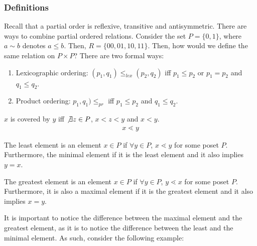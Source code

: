 \documentclass[a4paper]{article}
\theoremstyle{plain}
\theoremstyle{definition}
\newtheorem{defn}{Definition}[section]
\theoremstyle{remark}
\begin{document}
\subsubsection{Definitions}
Recall that a partial order is reflexive, transitive and antisymmetric. There are ways to combine partial ordered relations. Consider the set $P=\{ 0,1 \}$, where $a \sim b$ denotes $a \le b$. Then, $R = \{ 00, 01, 10, 11 \}$. Then, how would we define the same relation on  $P \times P$? There are two formal ways:
\begin{enumerate}
	\item Lexicographic ordering: $(p_1,q_1) \le_{lex}  (p_2,q_2)$ iff $p_1 \le  p_2$ or $p_1 = p_2$ and $q_1 \le q_2$.
	\item Product ordering: $p_1,q_1) \le _{pr}$ iff $p_1 \le  p_2$ and $q_1 \le q_2$.
\end{enumerate}
\begin{tcolorbox}[colback=black!3!white,colframe=black!60!white,title=\begin{defn}Covering \label{Covering}\end{defn}] $x$ is covered by $y$ iff $\not\exists z \in P$, $x < z < y$ and $x<y$.
\begin{align}
x \lessdot y
\end{align}
\end{tcolorbox}
\begin{tcolorbox}[colback=black!3!white,colframe=black!60!white,title=\begin{defn}The least element \label{The least element}\end{defn}]
The least element is an element $x \in P$ if $\forall y \in P$, $x \lessdot y$ for some poset $P$. Furthermore, the minimal element if it is the least element and it also implies $y=x$.
\end{tcolorbox}
\begin{tcolorbox}[colback=black!3!white,colframe=black!60!white,title=\begin{defn}The greatest element \label{The greatest element}\end{defn}]
The greatest element is an element $x \in P$ if $\forall y \in P$, $y \lessdot x$ for some poset $P$. Furthermore, it is also a maximal element if it is the greatest element and it also implies  $x=y$.
\end{tcolorbox}
It is important to notice the difference between the maximal element and the greatest element, as it is to notice the difference between the least and the minimal element. As such, consider the following example:
\end{document}
